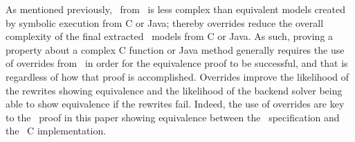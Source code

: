 As mentioned previously, \sawcore\ from \cryptol\ is less complex than equivalent models created by symbolic execution from C or Java; thereby overrides reduce the overall complexity of the final extracted \sawcore\ models from C or Java.
As such, proving a property about a complex C function or Java method generally requires the use of overrides from \cryptol\ in order for the equivalence proof to be successful, and that is regardless of how that proof is accomplished.
Overrides improve the likelihood of the rewrites showing equivalence and the likelihood of the backend solver being able to show equivalence if the rewrites fail.
Indeed, the use of overrides are key to the \saw\ proof in this paper showing equivalence between the \shaThree\ specification and the \openssl\ C implementation.
